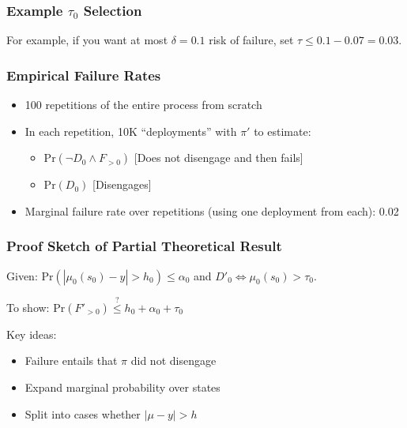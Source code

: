 \documentclass[handout]{beamer}
\begin{document}
\begin{frame}
    \frametitle{Example $\tau_0$ Selection}


    For example, if you want at most $\delta = 0.1$ risk of failure, set $\tau \leq 0.1 - 0.07 = 0.03$.

\end{frame}

\begin{frame}
    \frametitle{Empirical Failure Rates}


    \begin{itemize}
    \item 100 repetitions of the entire process from scratch
    \item In each repetition, 10K ``deployments'' with $\pi'$ to estimate:
        \begin{itemize}
        \item $\text{Pr}(\neg D_0 \wedge F_{>0})$ [Does not disengage and then fails]
        \item $\text{Pr}(D_0)$ [Disengages]
        \end{itemize}
    \item Marginal failure rate over repetitions (using one deployment from each): 0.02
    \end{itemize}

\end{frame}

\begin{frame}
    \frametitle{Proof Sketch of Partial Theoretical Result}

    Given: $\text{Pr}(|\mu_0(s_0) - y| > h_0) \leq \alpha_0$ and $D'_0 \Leftrightarrow \mu_0(s_0) > \tau_0$.

    To show: $\text{Pr}(F'_{>0}) \overset{?}{\leq} h_0 + \alpha_0 + \tau_0$

    \vspace{.5em}

    Key ideas:
    \begin{itemize}
    \item Failure entails that $\pi$ did not disengage
    \item Expand marginal probability over states
    \item Split into cases whether $|\mu - y|>h$
    \end{itemize}


\end{frame}
\end{document}
